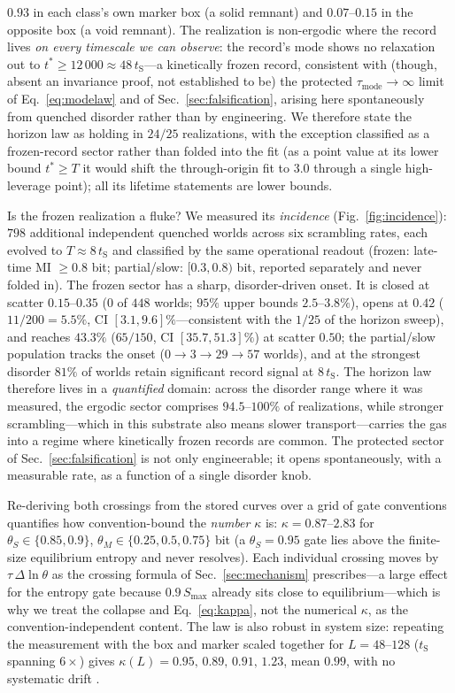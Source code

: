 \documentclass[aps,pre,twocolumn,superscriptaddress,nofootinbib,longbibliography]{revtex4-2}
\newcommand{\tS}{t_{\mathrm{S}}}
\newcommand{\tstar}{t^{*}}
\newcommand{\Smax}{S_{\max}}
\newcommand{\kap}{\kappa}
\begin{document}
$0.93$ in each class's own marker box (a solid remnant) and $0.07$--$0.15$ in the opposite
box (a void remnant). The realization is non-ergodic where the record lives \emph{on
every timescale we can observe}: the record's mode shows no relaxation out to
$\tstar\ge12\,000\approx48\,\tS$---a kinetically frozen record, consistent with (though,
absent an invariance proof, not established to be) the protected
$\tau_{\mathrm{mode}}\to\infty$ limit of Eq.~\eqref{eq:modelaw} and of
Sec.~\ref{sec:falsification}, arising here spontaneously from quenched disorder rather
than by engineering. We therefore state the horizon law as holding in $24/25$
realizations, with the exception classified as a frozen-record sector rather than folded
into the fit (as a point value at its lower bound $\tstar\ge T$ it would shift the
through-origin fit to $3.0$ through a single high-leverage point); all its lifetime
statements are lower bounds.

Is the frozen realization a fluke? We measured its \emph{incidence}
(Fig.~\ref{fig:incidence}): $798$ additional independent quenched worlds across six
scrambling rates, each evolved to $T\approx8\,\tS$ and classified by the same operational
readout (frozen: late-time MI $\ge0.8$ bit; partial/slow: $[0.3,0.8)$ bit, reported
separately and never folded in). The frozen sector has a sharp, disorder-driven onset. It
is closed at scatter $0.15$--$0.35$ ($0$ of $448$ worlds; $95\%$ upper bounds
$2.5$--$3.8\%$), opens at $0.42$ ($11/200=5.5\%$, CI $[3.1,9.6]\%$---consistent with the
$1/25$ of the horizon sweep), and reaches $43.3\%$ ($65/150$, CI $[35.7,51.3]\%$) at
scatter $0.50$; the partial/slow population tracks the onset ($0\to3\to29\to57$ worlds),
and at the strongest disorder $81\%$ of worlds retain significant record signal at
$8\,\tS$. The horizon law therefore lives in a \emph{quantified} domain: across the
disorder range where it was measured, the ergodic sector comprises $94.5$--$100\%$ of
realizations, while stronger scrambling---which in this substrate also means slower
transport---carries the gas into a regime where kinetically frozen records are common.
The protected sector of Sec.~\ref{sec:falsification} is not only engineerable; it opens
spontaneously, with a measurable rate, as a function of a single disorder knob.

Re-deriving both crossings from the stored curves over a grid of gate
conventions quantifies how convention-bound the \emph{number} $\kap$ is:
$\kap=0.87$--$2.83$ for $\theta_S\in\{0.85,0.9\}$, $\theta_M\in\{0.25,0.5,0.75\}$ bit
(a $\theta_S=0.95$ gate lies above the finite-size equilibrium entropy and never resolves).
Each individual crossing moves by $\tau\,\Delta\ln\theta$ as the crossing formula of
Sec.~\ref{sec:mechanism} prescribes---a large effect for the entropy gate because
$0.9\,\Smax$ already sits close to equilibrium---which is why we treat the collapse and
Eq.~\eqref{eq:kappa}, not the numerical $\kap$, as the convention-independent content. The law is also robust in system size: repeating the measurement
with the box and marker scaled together for $L=48$--$128$ ($\tS$ spanning $6\times$) gives
$\kap(L)=0.95,\,0.89,\,0.91,\,1.23$, mean $0.99$, with no systematic drift \cite{repo}.
\end{document}
